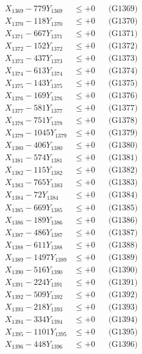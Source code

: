 \documentclass[a4paper,10pt]{article}
\begin{document}
{\begin{align}
X_{1369} - 779Y_{1369} &\leq +0 && \text{(G1369)} \\
X_{1370} - 118Y_{1370} &\leq +0 && \text{(G1370)} \\
\allowbreak
X_{1371} - 667Y_{1371} &\leq +0 && \text{(G1371)} \\
X_{1372} - 152Y_{1372} &\leq +0 && \text{(G1372)} \\
X_{1373} - 437Y_{1373} &\leq +0 && \text{(G1373)} \\
X_{1374} - 613Y_{1374} &\leq +0 && \text{(G1374)} \\
X_{1375} - 143Y_{1375} &\leq +0 && \text{(G1375)} \\
X_{1376} - 169Y_{1376} &\leq +0 && \text{(G1376)} \\
X_{1377} - 581Y_{1377} &\leq +0 && \text{(G1377)} \\
X_{1378} - 751Y_{1378} &\leq +0 && \text{(G1378)} \\
X_{1379} - 1045Y_{1379} &\leq +0 && \text{(G1379)} \\
X_{1380} - 406Y_{1380} &\leq +0 && \text{(G1380)} \\
\allowbreak
X_{1381} - 574Y_{1381} &\leq +0 && \text{(G1381)} \\
X_{1382} - 115Y_{1382} &\leq +0 && \text{(G1382)} \\
X_{1383} - 765Y_{1383} &\leq +0 && \text{(G1383)} \\
X_{1384} - 72Y_{1384} &\leq +0 && \text{(G1384)} \\
X_{1385} - 669Y_{1385} &\leq +0 && \text{(G1385)} \\
X_{1386} - 189Y_{1386} &\leq +0 && \text{(G1386)} \\
X_{1387} - 486Y_{1387} &\leq +0 && \text{(G1387)} \\
X_{1388} - 611Y_{1388} &\leq +0 && \text{(G1388)} \\
X_{1389} - 1497Y_{1389} &\leq +0 && \text{(G1389)} \\
X_{1390} - 516Y_{1390} &\leq +0 && \text{(G1390)} \\
\allowbreak
X_{1391} - 224Y_{1391} &\leq +0 && \text{(G1391)} \\
X_{1392} - 509Y_{1392} &\leq +0 && \text{(G1392)} \\
X_{1393} - 218Y_{1393} &\leq +0 && \text{(G1393)} \\
X_{1394} - 334Y_{1394} &\leq +0 && \text{(G1394)} \\
X_{1395} - 1101Y_{1395} &\leq +0 && \text{(G1395)} \\
X_{1396} - 448Y_{1396} &\leq +0 && \text{(G1396)} \\

\end{align}}
\end{document}
